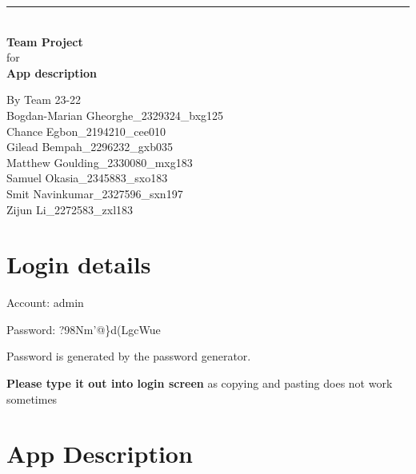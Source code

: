 \documentclass[a4paper]{article}
\begin{document}

\begin{titlepage}
	
	\rule{\linewidth}{5pt}
	\raggedleft
	\fontsize{38pt}{50pt}\selectfont
    \textbf{\\Team Project\\}
    \fontsize{28pt}{60pt}\selectfont 
    for\\
    \fontsize{38pt}{60pt}\selectfont 
    \textbf{App description\\}
	
	\vfill %
	
	
	\parbox[t]{0.93\textwidth}{ %
		\raggedleft %
		\large %
		{\Large By Team 23-22}\\[4pt] %
		Bogdan-Marian Gheorghe\_2329324\_bxg125\\
		Chance Egbon\_2194210\_cee010\\
		Gilead Bempah\_2296232\_gxb035\\
		Matthew Goulding\_2330080\_mxg183\\
		Samuel Okasia\_2345883\_sxo183\\
		Smit Navinkumar\_2327596\_sxn197\\
		Zijun Li\_2272583\_zxl183\\
	}
	
\end{titlepage}

\section*{Login details}

Account: admin 

Password: ?98Nm'@\}d(LgcWue

{\small Password is generated by the password generator.

\textbf{Please type it out into login screen} as copying and pasting does not work sometimes}

\section*{App Description}
\end{document}
